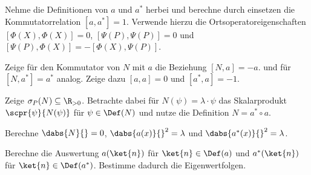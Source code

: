 \documentclass{subfiles}
\begin{document}
        \begin{Aufgabe}
            \nr{} Nehme die Definitionen von $a$ und $a^*$ herbei und berechne durch einsetzen die Kommutatorrelation $[a,a^*] = 1$. Verwende hierzu die Ortsoperatoreigenschaften $[\Phi(X),\Phi(X)] = 0$, $[\Psi(P),\Psi(P)] = 0$ und $[\Psi(P),\Phi(X)] = -[\Phi(X),\Psi(P)]$. 
            
            \nr{} Zeige für den Kommutator von $N$ mit $a$ die Beziehung $[N,a] = -a$. und für $[N,a^*] = a^*$ analog. Zeige dazu $[a,a] = 0$ und $[a^*,a] = -1$. 

            \nr{} Zeige $\sigma_P(N)\subseteq\R_{>0}$. Betrachte dabei für $N(\psi) = \lambda\cdot\psi$ das Skalarprodukt $\scpr{\psi}{N(\psi)}$ für $\psi\in\Def(N)$ und nutze die Definition $N = a^*\circ a$. 

            \nr{} Berechne $\dabs{N}{} = 0$, $\dabs{a(x)}{}^2 = \lambda$ und $\dabs{a^*(x)}{}^2 = \lambda$. 

            \nr{} Berechne die Auswertung $a(\ket{n})$ für $\ket{n}\in\Def(a)$ und $a^*(\ket{n})$ für $\ket{n}\in\Def(a^*)$. Bestimme dadurch die Eigenwertfolgen. 
        \end{Aufgabe} 
\end{document}
